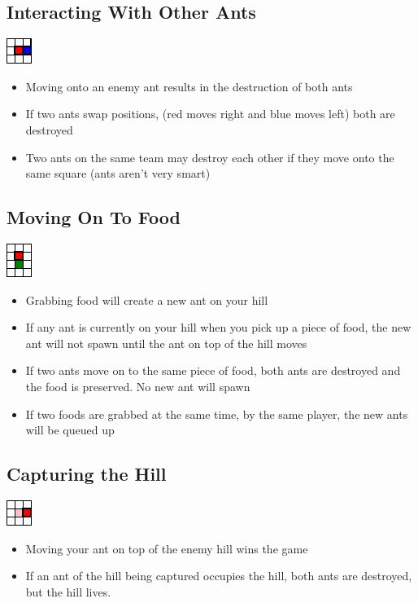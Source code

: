 \documentclass{article}
\begin{document}
\subsection{Interacting With Other Ants}
\begin{center}
\includegraphics{fight.png}
\end{center}
\begin{itemize}
  \item Moving onto an enemy ant results in the destruction of both ants
  \item If two ants swap positions, (red moves right and blue moves left) both are destroyed
  \item Two ants on the same team may destroy each other if they move onto the same square (ants aren't very smart)
\end{itemize}

\subsection{Moving On To Food}
\begin{center}
\includegraphics{foodGrab.png}
\end{center}
\begin{itemize}
  \item Grabbing food will create a new ant on your hill
  \item If any ant is currently on your hill when you pick up a piece of food, the new ant will not spawn until the ant on top of the hill moves
  \item If two ants move on to the same piece of food, both ants are destroyed and the food is preserved. No new ant will spawn
  \item If two foods are grabbed at the same time, by the same player, the new ants will be queued up
\end{itemize}

\subsection{Capturing the Hill}
\begin{center}
\includegraphics{hillCapture.png}
\end{center}
\begin{itemize}
  \item Moving your ant on top of the enemy hill wins the game
  \item If an ant of the hill being captured occupies the hill, both ants are destroyed, but the hill lives. 
\end{itemize}
\end{document}
